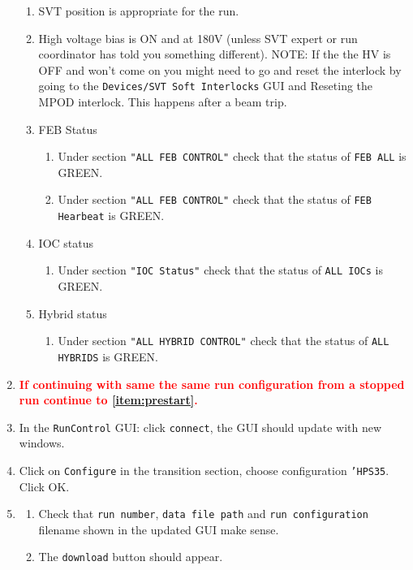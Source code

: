 \documentclass[12pt]{article}
\begin{document}
\begin{enumerate}
\begin{enumerate}
\item
SVT position is appropriate for the run. 

\item 
High voltage bias is ON and at  180V (unless SVT expert  or run coordinator has told you something different). 
\newline NOTE: If the the HV is OFF and won't come on you might need to go and reset the interlock by going to the \texttt{Devices/SVT Soft Interlocks} GUI and Reseting the MPOD interlock. This happens after a beam trip. 
\newline {\bf \textcolor{red}{Important: Check that beam conditions for turning on bias voltage is OK before switching on!}}


\item FEB Status
\begin{enumerate}
\item Under section \texttt{"ALL FEB CONTROL"} check that the status of \texttt{FEB ALL} is GREEN.
\item Under section \texttt{"ALL FEB CONTROL"} check that the status of \texttt{FEB Hearbeat} is GREEN.
\end{enumerate}

\item IOC status
\begin{enumerate}
\item Under section \texttt{"IOC Status"} check that the status of \texttt{ALL IOCs} is GREEN.
\end{enumerate}

\item Hybrid status
\begin{enumerate}
\item Under section \texttt{"ALL HYBRID CONTROL"} check that the status of \texttt{ALL HYBRIDS} is GREEN.
\end{enumerate}

\end{enumerate}

\item \textcolor{red}{ {\bf If continuing with same the same run configuration from a stopped run continue to \ref{item:prestart}.}}

\item In the \texttt{RunControl} GUI: click \texttt{connect}, the GUI should update with new windows. 

\item Click on \texttt{Configure} in the transition section, choose configuration \texttt{'HPS35}. Click OK.
\item
\begin{enumerate}
\item
Check that \texttt{run number}, \texttt{data file path} and \texttt{run configuration} filename shown in the updated GUI make sense. 
\item
The \texttt{download} button should appear. 
\end{enumerate}



\end{enumerate}
\end{document}
